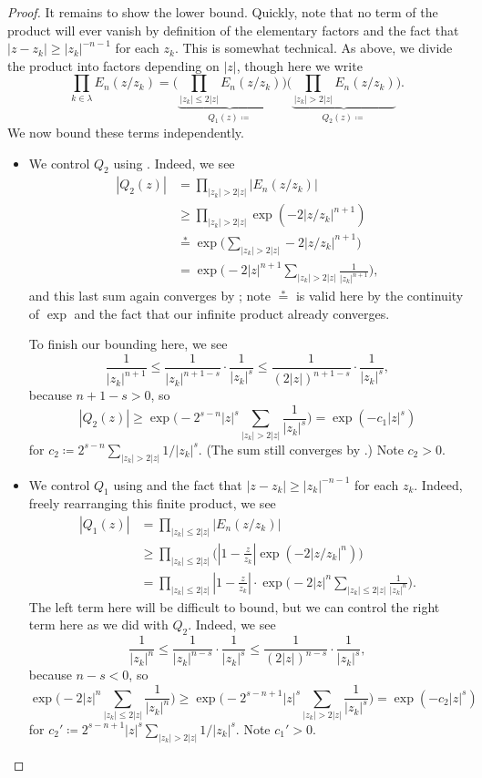 \documentclass[notes.tex]{subfiles}
\begin{document}
\begin{proof}
	It remains to show the lower bound. Quickly, note that no term of the product will ever vanish by definition of the elementary factors and the fact that $|z-z_k|\ge|z_k|^{-n-1}$ for each $z_k$. This is somewhat technical. As above, we divide the product into factors depending on $|z|$, though here we write
	\[\prod_{k\in\lambda} E_n(z/z_k)=\Bigg(\underbrace{\prod_{|z_k|\le2|z|}E_n(z/z_k)}_{Q_1(z)\coloneqq}\Bigg)\Bigg(\underbrace{\prod_{|z_k|>2|z|}E_n(z/z_k)}_{Q_2(z)\coloneqq}\Bigg).\]
	We now bound these terms independently.
	\begin{itemize}
		\item We control $Q_2$ using . Indeed, we see
		\begin{align*}
			|Q_2(z)| &= \prod_{|z_k|>2|z|}|E_n(z/z_k)| \\
			&\ge \prod_{|z_k|>2|z|}\exp\left(-2|z/z_k|^{n+1}\right) \\
			&\stackrel*= \exp\Bigg(\sum_{|z_k|>2|z|}-2|z/z_k|^{n+1}\Bigg) \\
			&= \exp\Bigg(-2|z|^{n+1}\sum_{|z_k|>2|z|}\frac1{|z_k|^{n+1}}\Bigg),
		\end{align*}
		and this last sum again converges by ; note $\stackrel*=$ is valid here by the continuity of $\exp$ and the fact that our infinite product already converges.

		To finish our bounding here, we see
		\[\frac1{|z_k|^{n+1}}\le\frac1{|z_k|^{n+1-s}}\cdot\frac1{|z_k|^{s}}\le\frac1{(2|z|)^{n+1-s}}\cdot\frac1{|z_k|^{s}},\]
		because $n+1-s>0$, so
		\[|Q_2(z)|\ge\exp\Bigg(-2^{s-n}|z|^s\sum_{|z_k|>2|z|}\frac1{|z_k|^s}\Bigg)=\exp\left(-c_1|z|^s\right)\]
		for $c_2\coloneqq2^{s-n}\sum_{|z_k|>2|z|}1/|z_k|^s$. (The sum still converges by .) Note $c_2>0$.

		\item We control $Q_1$ using  and the fact that $|z-z_k|\ge|z_k|^{-n-1}$ for each $z_k$. Indeed, freely rearranging this finite product, we see
		\begin{align*}
			|Q_1(z)| &= \prod_{|z_k|\le2|z|}|E_n(z/z_k)| \\
			&\ge \prod_{|z_k|\le2|z|}\Bigg(\left|1-\frac z{z_k}\right|\exp\left(-2|z/z_k|^n\right)\Bigg) \\
			&= \prod_{|z_k|\le2|z|}\left|1-\frac z{z_k}\right|\cdot\exp\Bigg(-2|z|^n\sum_{|z_k|\le2|z|}\frac1{|z_k|^n}\Bigg).
		\end{align*}
		The left term here will be difficult to bound, but we can control the right term here as we did with $Q_2$. Indeed, we see
		\[\frac1{|z_k|^n}\le\frac1{|z_k|^{n-s}}\cdot\frac1{|z_k|^{s}}\le\frac1{(2|z|)^{n-s}}\cdot\frac1{|z_k|^{s}},\]
		because $n-s<0$, so
		\[\exp\Bigg(-2|z|^n\sum_{|z_k|\le2|z|}\frac1{|z_k|^n}\Bigg)\ge\exp\Bigg(-2^{s-n+1}|z|^s\sum_{|z_k|>2|z|}\frac1{|z_k|^s}\Bigg)=\exp\left(-c_2|z|^s\right)\]
		for $c_2'\coloneqq2^{s-n+1}|z|^s\sum_{|z_k|>2|z|}1/|z_k|^s$. Note $c_1'>0$.


\end{itemize}
\end{proof}
\end{document}
